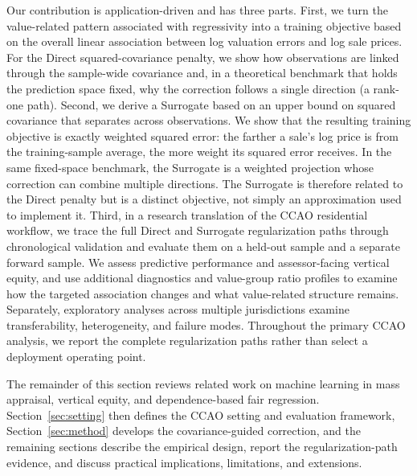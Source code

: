 \documentclass[10pt]{article}
\theoremstyle{definition}
\newcommand{\1}{\mathbf{1}}
\newcommand{\oldtext}[1]{\textcolor{blue}{\sout{#1}}}
\newcommand{\newtext}[1]{\textcolor{impGreen}{#1}}
\begin{document}
\newtext{
Our contribution is application-driven and has three parts. First, we turn the value-related pattern associated with regressivity into a training objective based on the overall linear association between log valuation errors and log sale prices. For the Direct squared-covariance penalty, we show how observations are linked through the sample-wide covariance and, in a theoretical benchmark that holds the prediction space fixed, why the correction follows a single direction (a rank-one path). Second, we derive a Surrogate based on an upper bound on squared covariance that separates across observations. We show that the resulting training objective is exactly weighted squared error: the farther a sale's log price is from the training-sample average, the more weight its squared error receives. In the same fixed-space benchmark, the Surrogate is a weighted projection whose correction can combine multiple directions. The Surrogate is therefore related to the Direct penalty but is a distinct objective, not simply an approximation used to implement it. Third, in a research translation of the CCAO residential workflow, we trace the full Direct and Surrogate regularization paths through chronological validation and evaluate them on a held-out sample and a separate forward sample. We assess predictive performance and assessor-facing vertical equity, and use additional diagnostics and value-group ratio profiles to examine how the targeted association changes and what value-related structure remains. Separately, exploratory analyses across multiple jurisdictions examine transferability, heterogeneity, and failure modes.
}
\newtext{Throughout the primary CCAO analysis, we report the complete regularization paths rather than select a deployment operating point.}

\newtext{The remainder of this section reviews related work on machine learning in mass appraisal, vertical equity, and dependence-based fair regression. Section~\ref{sec:setting} then defines the CCAO setting and evaluation framework, Section~\ref{sec:method} develops the covariance-guided correction, and the remaining sections describe the empirical design, report the regularization-path evidence, and discuss practical implications, limitations, and extensions.}
\end{document}
